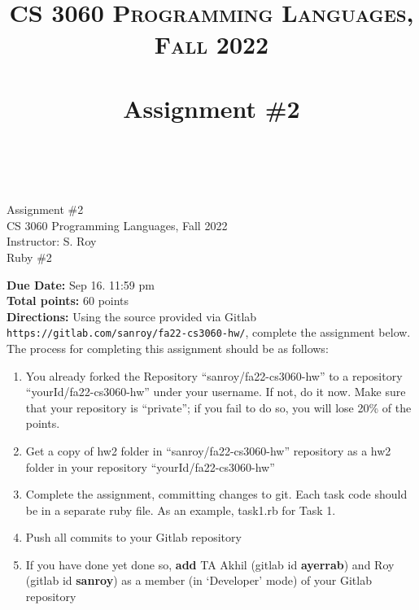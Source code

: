 \documentclass[paper=letter, fontsize=11pt]{scrartcl} %
\title{ 
    \normalfont \normalsize 
    \textsc{CS 3060 Programming Languages, Fall 2022} \\ [25pt] %
    \horrule{0.5pt} \\[0.4cm] %
    \huge Assignment \#2  \\ %
    \horrule{2pt} \\[0.5cm] %
}
\begin{document}
    \begin{center}
         Assignment \#2\\
        \small CS 3060 Programming Languages, Fall 2022 \\
        \small Instructor: S. Roy \\
        \huge Ruby \#2
    \end{center}
    
    \textbf{Due Date:}  Sep 16. 11:59 pm\\

    \textbf{Total points:} 60 points \\

    \textbf{Directions:} Using the source provided via Gitlab \@ \texttt{https://gitlab.com/sanroy/fa22-cs3060-hw/}, 
complete the assignment below. The process for completing this assignment should be as follows:

    \begin{enumerate}[noitemsep]
        \item You already forked the Repository ``sanroy/fa22-cs3060-hw'' to a repository ``yourId/fa22-cs3060-hw'' under your username. If not, do it now. Make sure that your repository is ``private''; if you fail to do so, you will lose 20\% of the points.
        \item Get a copy of hw2 folder in ``sanroy/fa22-cs3060-hw'' repository as a hw2 folder in your repository ``yourId/fa22-cs3060-hw'' 
        \item Complete the assignment, committing changes to git. Each task code should be in a separate ruby file. As an example, task1.rb for Task 1. 
        \item Push all commits to your Gitlab repository
        \item If you have done yet done so, \textbf{add} TA Akhil (gitlab id \textbf{ayerrab}) and Roy (gitlab id \textbf{sanroy}) as a member (in `Developer' mode) of your Gitlab repository
    \end{enumerate}
\end{document}
